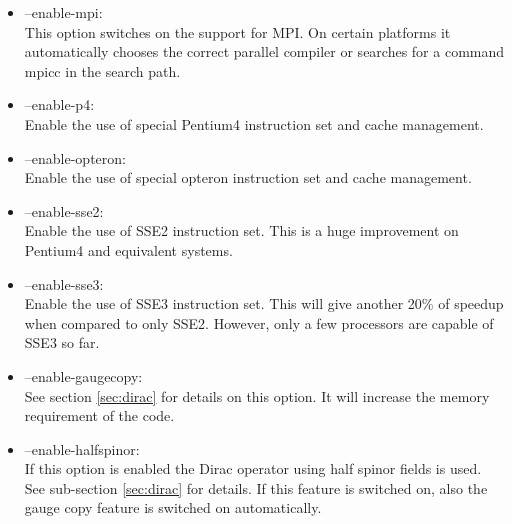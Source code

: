 \begin{itemize}
\item {\ttfamily --enable-mpi}:\\
  This option switches on the support for MPI. On certain platforms it
  automatically chooses the correct parallel compiler or searches for
  a command {\ttfamily mpicc} in the search path.

\item {\ttfamily --enable-p4}:\\
  Enable the use of special Pentium4 instruction set and cache
  management.

\item {\ttfamily --enable-opteron}:\\
  Enable the use of special opteron instruction set and cache
  management.


\item {\ttfamily --enable-sse2}:\\
  Enable the use of SSE2 instruction set. This is a huge improvement
  on Pentium4 and equivalent systems.

\item {\ttfamily --enable-sse3}:\\
  Enable the use of SSE3 instruction set. This will give another 20\%
  of speedup when compared to only SSE2. However, only a few
  processors are capable of SSE3 so far.

\item {\ttfamily --enable-gaugecopy}:\\
  See section \ref{sec:dirac} for details on this option. It will
  increase the memory requirement of the code.

\item {\ttfamily --enable-halfspinor}:\\
  If this option is enabled the Dirac operator using half spinor
  fields is used. See sub-section \ref{sec:dirac} for details. If this
  feature is switched on, also the gauge copy feature is switched
  on automatically. 



\end{itemize}
